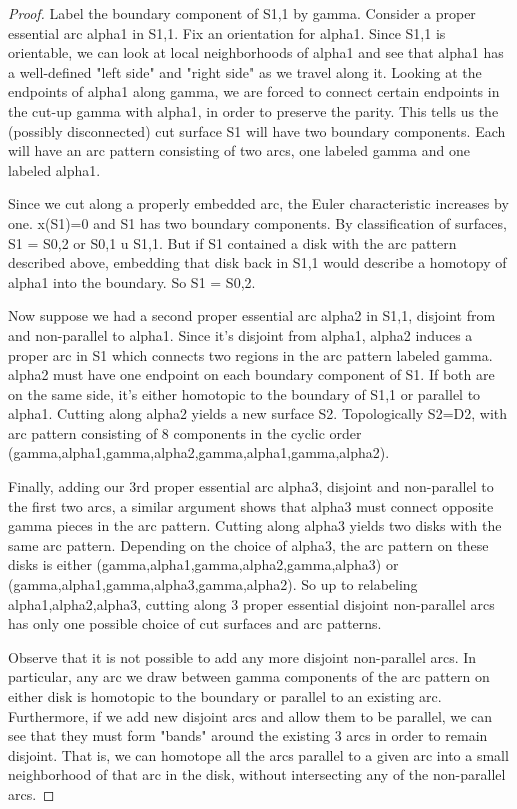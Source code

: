 \documentclass[12pt]{amsart}
\theoremstyle{definition}
\begin{document}
\begin{proof}
Label the boundary component of S1,1 by gamma. Consider a proper essential arc
alpha1 in S1,1. Fix an orientation for alpha1. Since S1,1 is orientable, we can
look at local neighborhoods of alpha1 and see that alpha1 has a well-defined
"left side" and "right side" as we travel along it. Looking at the endpoints of
alpha1 along gamma, we are forced to connect certain endpoints in the cut-up
gamma with alpha1, in order to preserve the parity. This tells us the (possibly
disconnected) cut surface S1 will have two boundary components. Each will have
an arc pattern consisting of two arcs, one labeled gamma and one labeled
alpha1.

Since we cut along a properly embedded arc, the Euler characteristic increases
by one. x(S1)=0 and S1 has two boundary components. By classification of
surfaces, S1 = S0,2 or S0,1 u S1,1. But if S1 contained a disk with the arc
pattern described above, embedding that disk back in S1,1 would describe
a homotopy of alpha1 into the boundary. So S1 = S0,2.

Now suppose we had a second proper essential arc alpha2 in S1,1, disjoint from
and non-parallel to alpha1. Since it's disjoint from alpha1, alpha2 induces
a proper arc in S1 which connects two regions in the arc pattern labeled gamma.
alpha2 must have one endpoint on each boundary component of S1. If both are on
the same side, it's either homotopic to the boundary of S1,1 or parallel to
alpha1. Cutting along alpha2 yields a new surface S2. Topologically S2=D2, with
arc pattern consisting of 8 components in the cyclic order
(gamma,alpha1,gamma,alpha2,gamma,alpha1,gamma,alpha2).

Finally, adding our 3rd proper essential arc alpha3, disjoint and non-parallel
to the first two arcs, a similar argument shows that alpha3 must connect
opposite gamma pieces in the arc pattern. Cutting along alpha3 yields two disks
with the same arc pattern. Depending on the choice of alpha3, the arc pattern
on these disks is either (gamma,alpha1,gamma,alpha2,gamma,alpha3) or
(gamma,alpha1,gamma,alpha3,gamma,alpha2). So up to relabeling
alpha1,alpha2,alpha3, cutting along 3 proper essential disjoint non-parallel
arcs has only one possible choice of cut surfaces and arc patterns.

Observe that it is not possible to add any more disjoint non-parallel arcs. In
particular, any arc we draw between gamma components of the arc pattern on
either disk is homotopic to the boundary or parallel to an existing arc.
Furthermore, if we add new disjoint arcs and allow them to be parallel, we can
see that they must form "bands" around the existing 3 arcs in order to remain
disjoint. That is, we can homotope all the arcs parallel to a given arc into
a small neighborhood of that arc in the disk, without intersecting any of the
non-parallel arcs.


\end{proof}
\end{document}
